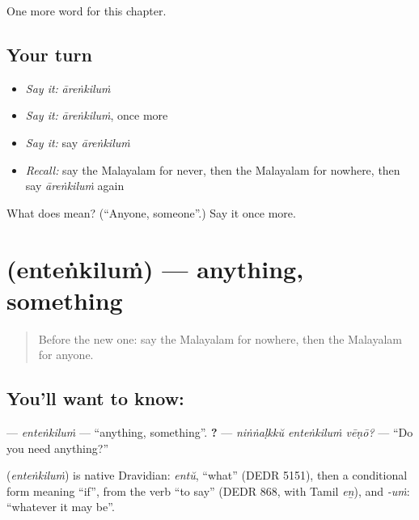 \begin{grammarlens}[title={What you've built}]
One more word for this chapter.
\end{grammarlens}

\subsection*{Your turn}
\begin{itemize}
\raggedright
  \item \emph{Say it:} \emph{āreṅkiluṁ}
  \item \emph{Say it:} \emph{āreṅkiluṁ}, once more
  \item \emph{Say it:} say \emph{āreṅkiluṁ}
  \item \emph{Recall:} say the Malayalam for never, then the Malayalam for nowhere, then say \emph{āreṅkiluṁ} again
\end{itemize}

\begin{tcolorbox}[breakable,colback=teal!4,colframe=teal!35!black,title={Before you move on}]
What does  mean? (\textquotedblleft{}Anyone, someone\textquotedblright{}.) Say it once more.
\end{tcolorbox}
\section[\texorpdfstring{\ml{എന്തെങ്കിലും} (enteṅkiluṁ)}{എന്തെങ്കിലും (enteṅkiluṁ)}]{ (enteṅkiluṁ) — anything, something}

\label{lesson:ML-C177-entenkilum}



\begin{quote}
Before the new one: say the Malayalam for nowhere, then the Malayalam for anyone.
\end{quote}

\subsection*{You'll want to know: }
\textbf{} — \emph{enteṅkiluṁ} — \textquotedblleft{}anything, something\textquotedblright{}. \textbf{  ?} — \emph{niṅṅaḷkkŭ enteṅkiluṁ vēṇō?} — \textquotedblleft{}Do you need anything?\textquotedblright{}

\begin{cousinweb}
\textbf{} (\emph{enteṅkiluṁ}) is native Dravidian: \emph{entŭ}, \textquotedblleft{}what\textquotedblright{} (DEDR 5151), then a conditional form meaning \textquotedblleft{}if\textquotedblright{}, from the verb \textquotedblleft{}to say\textquotedblright{} (DEDR 868, with Tamil \emph{eṉ}), and \emph{-uṁ}: \textquotedblleft{}whatever it may be\textquotedblright{}.
\end{cousinweb}

